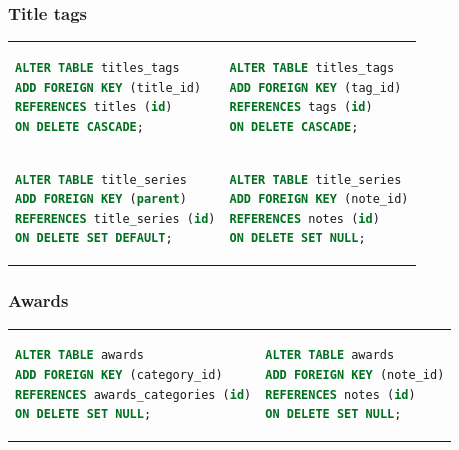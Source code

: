 \documentclass[doubleside, titlepage]{article}
\begin{document}
\subsubsection{Title tags}
\begin{tabular}{ ll }
\begin{minipage}{3in}
\begin{lstlisting}[language=SQL,showspaces=false,basicstyle=\ttfamily,numberstyle=\tiny,commentstyle=\color{gray}
        ]
ALTER TABLE titles_tags
ADD FOREIGN KEY (title_id)
REFERENCES titles (id)
ON DELETE CASCADE;
\end{lstlisting}
\end{minipage}
 &
\begin{minipage}{3in}
\begin{lstlisting}[language=SQL,showspaces=false,basicstyle=\ttfamily,numberstyle=\tiny,commentstyle=\color{gray}
        ]
ALTER TABLE titles_tags
ADD FOREIGN KEY (tag_id)
REFERENCES tags (id)
ON DELETE CASCADE;
\end{lstlisting}
\end{minipage}
 \\
\begin{minipage}{3in}
\begin{lstlisting}[language=SQL,showspaces=false,basicstyle=\ttfamily,numberstyle=\tiny,commentstyle=\color{gray}
        ]
ALTER TABLE title_series
ADD FOREIGN KEY (parent)
REFERENCES title_series (id)
ON DELETE SET DEFAULT;
\end{lstlisting}
\end{minipage}
 &
\begin{minipage}{3in}
\begin{lstlisting}[language=SQL,showspaces=false,basicstyle=\ttfamily,numberstyle=\tiny,commentstyle=\color{gray}
        ]
ALTER TABLE title_series
ADD FOREIGN KEY (note_id)
REFERENCES notes (id)
ON DELETE SET NULL;
\end{lstlisting}
\end{minipage}
\end{tabular}

\subsubsection{Awards}
\begin{tabular}{ ll }
\begin{minipage}{3in}
\begin{lstlisting}[language=SQL,showspaces=false,basicstyle=\ttfamily,numberstyle=\tiny,commentstyle=\color{gray}
        ]
ALTER TABLE awards
ADD FOREIGN KEY (category_id)
REFERENCES awards_categories (id)
ON DELETE SET NULL;
\end{lstlisting}
\end{minipage}
 &
\begin{minipage}{3in}
\begin{lstlisting}[language=SQL,showspaces=false,basicstyle=\ttfamily,numberstyle=\tiny,commentstyle=\color{gray}
        ]
ALTER TABLE awards
ADD FOREIGN KEY (note_id)
REFERENCES notes (id)
ON DELETE SET NULL;
\end{lstlisting}
\end{minipage}
\end{tabular}
\end{document}
